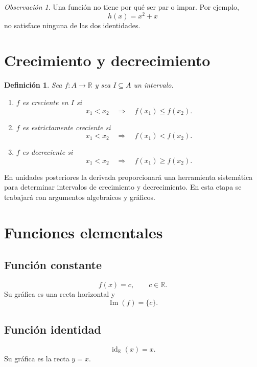 \documentclass[12pt]{article}
\newtheorem{definicion}{Definición}[section]
\theoremstyle{remark}
\newtheorem{observacion}{Observación}[section]
\newcommand{\R}{\mathbb{R}}
\newcommand{\Ima}{\operatorname{Im}}
\newcommand{\id}{\operatorname{id}}
\begin{document}
\begin{observacion}
Una función no tiene por qué ser par o impar. Por ejemplo,
\[
h(x)=x^2+x
\]
no satisface ninguna de las dos identidades.
\end{observacion}

\section{Crecimiento y decrecimiento}

\begin{definicion}
Sea $f:A\to\R$ y sea $I\subseteq A$ un intervalo.

\begin{enumerate}
    \item $f$ es \emph{creciente} en $I$ si
    \[
    x_1<x_2\quad\Longrightarrow\quad f(x_1)\leq f(x_2).
    \]
    \item $f$ es \emph{estrictamente creciente} si
    \[
    x_1<x_2\quad\Longrightarrow\quad f(x_1)<f(x_2).
    \]
    \item $f$ es \emph{decreciente} si
    \[
    x_1<x_2\quad\Longrightarrow\quad f(x_1)\geq f(x_2).
    \]
\end{enumerate}
\end{definicion}

En unidades posteriores la derivada proporcionará una herramienta sistemática
para determinar intervalos de crecimiento y decrecimiento. En esta etapa se
trabajará con argumentos algebraicos y gráficos.

\section{Funciones elementales}

\subsection{Función constante}

\[
f(x)=c,\qquad c\in\R.
\]
Su gráfica es una recta horizontal y
\[
\Ima(f)=\{c\}.
\]

\subsection{Función identidad}

\[
\id_{\R}(x)=x.
\]
Su gráfica es la recta $y=x$.
\end{document}
